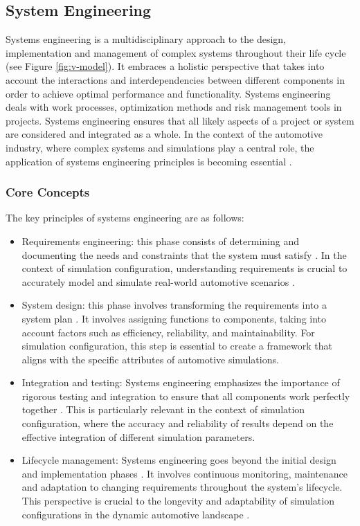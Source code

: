 \subsection{System Engineering \label{sec:sysen}}
Systems engineering is a multidisciplinary approach to the design, implementation and management of complex systems throughout their life cycle \cite{haberfellner2019systems} (see Figure \ref{fig:v-model}). It embraces a holistic perspective that takes into account the interactions and interdependencies between different components in order to achieve optimal performance and functionality. Systems engineering deals with work processes, optimization methods and risk management tools in projects. Systems engineering ensures that all likely aspects of a project or system are considered and integrated as a whole. In the context of the automotive industry, where complex systems and simulations play a central role, the application of systems engineering principles is becoming essential \cite{d2017systems}.

\subsubsection{Core Concepts}
    The key principles of systems engineering are as follows:
    \begin{itemize}
      \item Requirements engineering: this phase consists of determining and documenting the needs and constraints that the system must satisfy \cite{loper2015modeling}. In the context of simulation configuration, understanding requirements is crucial to accurately model and simulate real-world automotive scenarios \cite{keating2008system}.
      
      \item System design: this phase involves transforming the requirements into a system plan \cite{loper2015modeling, nielsen2015systems}. It involves assigning functions to components, taking into account factors such as efficiency, reliability, and maintainability. For simulation configuration, this step is essential to create a framework that aligns with the specific attributes of automotive simulations.
      
      \item Integration and testing: Systems engineering emphasizes the importance of rigorous testing and integration to ensure that all components work perfectly together \cite{loper2015modeling}. This is particularly relevant in the context of simulation configuration, where the accuracy and reliability of results depend on the effective integration of different simulation parameters.
      
      \item Lifecycle management: Systems engineering goes beyond the initial design and implementation phases \cite{loper2015modeling}. It involves continuous monitoring, maintenance and adaptation to changing requirements throughout the system's lifecycle. This perspective is crucial to the longevity and adaptability of simulation configurations in the dynamic automotive landscape \cite{nielsen2015systems}.
    \end{itemize}

